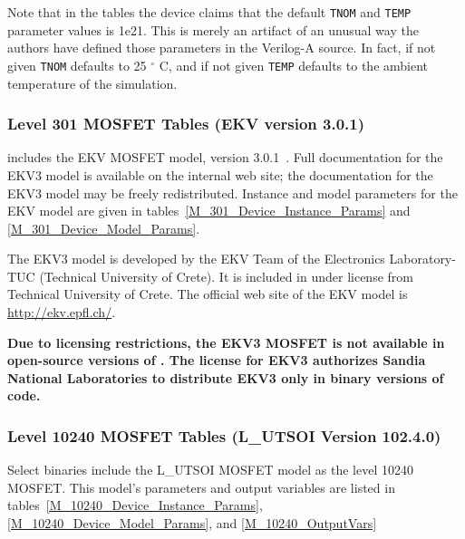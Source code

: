 Note that in the tables the device claims that the default
\texttt{TNOM} and \texttt{TEMP} parameter values is 1e21.  This is
merely an artifact of an unusual way the authors have defined those
parameters in the Verilog-A source.  In fact, if not given
\texttt{TNOM} defaults to 25 $^\circ$ C, and if not given \texttt{TEMP}
defaults to the ambient temperature of the simulation.




\clearpage
\subsubsection{Level 301 MOSFET Tables (EKV version 3.0.1)}
\Xyce{} includes the EKV MOSFET model, version
3.0.1~\cite{BLETK:1997}\cite{EKV:2006}\cite{EKV:2007}.  Full
documentation for the EKV3 model is available on the \Xyce{} internal web site;
the documentation for the EKV3 model may be freely redistributed.  Instance and
model parameters for the EKV model are given in
tables~\ref{M_301_Device_Instance_Params} and \ref{M_301_Device_Model_Params}.

The EKV3 model is developed by the EKV Team of the Electronics Laboratory-TUC
(Technical University of Crete). It is included in \Xyce{} under license from
Technical University of Crete.  The official web site of the EKV model is
\url{http://ekv.epfl.ch/}.

\textbf{Due to licensing restrictions, the EKV3 MOSFET is not available in
     open-source versions of \Xyce{}.  The license for EKV3 authorizes Sandia
     National Laboratories to distribute EKV3 only in binary versions of code.}





\clearpage
\subsubsection{Level 10240 MOSFET Tables (L\_UTSOI Version 102.4.0)}
Select \Xyce{} binaries include the L\_UTSOI MOSFET model as the level
10240 MOSFET.  This model's parameters and output variables are listed in tables~\ref{M_10240_Device_Instance_Params}, \ref{M_10240_Device_Model_Params}, and \ref{M_10240_OutputVars}





